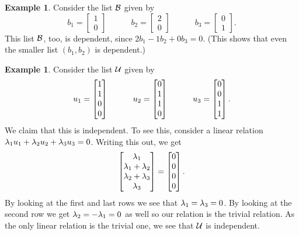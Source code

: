 \documentclass[reqno]{amsart}
\theoremstyle{definition}
\newtheorem{example}[theorem]{Example}
\begin{document}
\begin{example}\label{eg-dep-iii}
 Consider the list $\mathcal{B}$ given by
 \[
    b_1 = \begin{bmatrix} 1 \\ 0 \end{bmatrix} \hspace{3em}
    b_2 = \begin{bmatrix} 2 \\ 0 \end{bmatrix} \hspace{3em}
    b_3 = \begin{bmatrix} 0 \\ 1 \end{bmatrix} .
 \]
 This list $\mathcal{B}$, too, is dependent, since
 $2 b_1 - 1 b_2 + 0 b_3 = 0$.
 (This shows that even the smaller list $\left( b_1, b_2 \right)$
 is dependent.)
\end{example}
\begin{example}\label{eg-indep-i}
 Consider the list $\mathcal{U}$ given by
 \[ u_1 = \left[\begin{matrix} 1 \\ 1 \\ 0 \\ 0 \end{matrix}\right] \hspace{3em}
    u_2 = \left[\begin{matrix} 0 \\ 1 \\ 1 \\ 0 \end{matrix}\right] \hspace{3em}
    u_3 = \left[\begin{matrix} 0 \\ 0 \\ 1 \\ 1 \end{matrix}\right].
 \]
 We claim that this is independent.  To see this, consider a linear
 relation $\lambda_1u_1+\lambda_2u_2+\lambda_3u_3=0$.  Writing this out, we get
 \[ \left[\begin{matrix} \lambda_1 \\ \lambda_1+\lambda_2 \\ \lambda_2+\lambda_3 \\ \lambda_3 \end{matrix}\right] =
    \left[\begin{matrix} 0 \\ 0 \\ 0 \\ 0 \end{matrix}\right].
 \]
 By looking at the first and last rows we see that $\lambda_1=\lambda_3=0$.
 By looking at the second row we get $\lambda_2=-\lambda_1=0$ as well so our
 relation is the trivial relation.  As the only linear relation is the
 trivial one, we see that $\mathcal{U}$ is independent.
\end{example}
\end{document}
